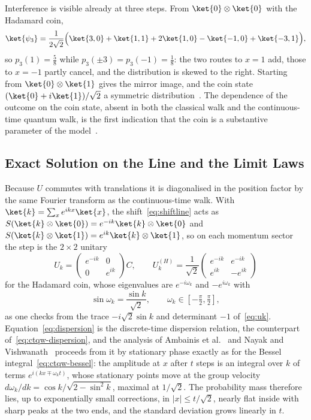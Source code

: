 Interference is visible already at three steps. From $\ket{0}\otimes\ket{0}$
with the Hadamard coin,
\begin{equation}
	\ket{\psi_3} = \frac{1}{2\sqrt{2}} \Bigl( \ket{3, 0} + \ket{1, 1} + 2\ket{1, 0} - \ket{-1, 0} + \ket{-3, 1} \Bigr),
\end{equation}
so $p_3(1) = \tfrac58$ while $p_3(\pm 3) = p_3(-1) = \tfrac18$: the two
routes to $x = 1$ add, those to $x = -1$ partly cancel, and the distribution
is skewed to the right. Starting from $\ket{0}\otimes\ket{1}$ gives the
mirror image, and the coin state $(\ket{0} + i\ket{1})/\sqrt{2}$ a symmetric
distribution~\cite{Kempe_2003}. The dependence of the outcome on the coin
state, absent in both the classical walk and the continuous-time quantum
walk, is the first indication that the coin is a substantive parameter of
the model~\cite{Tregenna_2003}.

\subsection{Exact Solution on the Line and the Limit Laws}
\label{sec:dtqw-line}
Because $U$ commutes with translations it is diagonalised in the position
factor by the same Fourier transform as the continuous-time walk. With
$\ket{k} = \sum_x e^{ikx}\ket{x}$, the shift~\eqref{eq:shiftline} acts as
$S(\ket{k}\otimes\ket{0}) = e^{-ik}\ket{k}\otimes\ket{0}$ and
$S(\ket{k}\otimes\ket{1}) = e^{ik}\ket{k}\otimes\ket{1}$, so on each momentum
sector the step is the $2 \times 2$ unitary
\begin{equation}
	U_k = \begin{pmatrix} e^{-ik} & 0 \\ 0 & e^{ik} \end{pmatrix} C ,
	\qquad
	U_k^{(H)} = \frac{1}{\sqrt{2}} \begin{pmatrix} e^{-ik} & e^{-ik} \\ e^{ik} & -e^{ik} \end{pmatrix}
	\label{eq:uk}
\end{equation}
for the Hadamard coin, whose eigenvalues are $e^{-i\omega_k}$ and
$-e^{i\omega_k}$ with
\begin{equation}
	\sin \omega_k = \frac{\sin k}{\sqrt{2}}, \qquad \omega_k \in [-\tfrac{\pi}{2}, \tfrac{\pi}{2}],
	\label{eq:dispersion}
\end{equation}
as one checks from the trace $-i\sqrt{2}\sin k$ and determinant $-1$
of~\eqref{eq:uk}. Equation~\eqref{eq:dispersion} is the discrete-time
dispersion relation, the counterpart of~\eqref{eq:ctqw-dispersion}, and the
analysis of Ambainis et al.~\cite{Ambainis_2001} and Nayak and
Vishwanath~\cite{Nayak_2000} proceeds from it by stationary phase exactly as
for the Bessel integral~\eqref{eq:ctqw-bessel}: the amplitude at $x$ after
$t$ steps is an integral over $k$ of terms $e^{i(kx \mp \omega_k t)}$, whose
stationary points move at the group velocity $d\omega_k/dk = \cos k/\sqrt{2 -
\sin^2 k}$, maximal at $1/\sqrt{2}$. The probability mass therefore lies, up
to exponentially small corrections, in $|x| \le t/\sqrt{2}$, nearly flat
inside with sharp peaks at the two ends, and the standard deviation grows
linearly in $t$.

